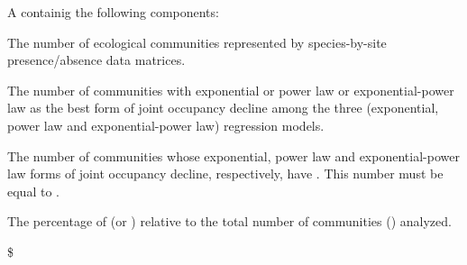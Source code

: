 \documentclass[a4paper]{book}
\begin{document}
\begin{Value}
A  containig the following components:
\begin{ldescription}
\item[\code{\code{n}}] The number of ecological communities represented by species-by-site
presence/absence  data matrices.
\item[\code{\code{n.lwst\_aic}}] The number of communities with exponential or power law or exponential-power
law as the best form of joint occupancy decline among the three (exponential, power law and
exponential-power law) regression models.
\item[\code{\code{n.delta\_aic}}] The number of communities whose exponential, power law and exponential-power
law forms of joint occupancy decline, respectively, have . This number must be
equal to .
\item[\code{\AsIs{\%}}] The percentage of  (or ) relative to the total number of
communities () analyzed.
\end{ldescription}
\$


\end{Value}
\end{document}
